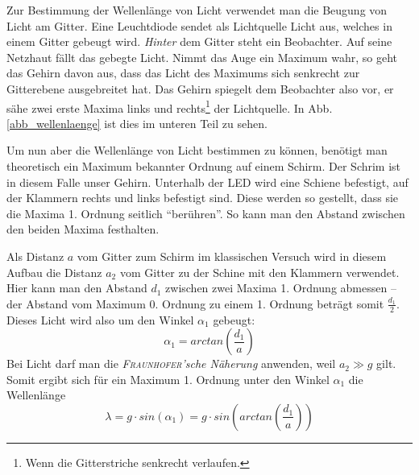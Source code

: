 Zur Bestimmung der Wellenlänge von Licht verwendet man die Beugung von Licht am Gitter. Eine Leuchtdiode sendet als Lichtquelle Licht aus, welches in einem Gitter gebeugt wird. \emph{Hinter} dem Gitter steht ein Beobachter. Auf seine Netzhaut fällt das gebegte Licht. Nimmt das Auge ein Maximum wahr, so geht das Gehirn davon aus, dass das Licht des Maximums sich senkrecht zur Gitterebene ausgebreitet hat. Das Gehirn spiegelt dem Beobachter also vor, er sähe zwei erste Maxima links und rechts\footnote{Wenn die Gitterstriche senkrecht verlaufen.} der Lichtquelle. In Abb. \ref{abb_wellenlaenge} ist dies im unteren Teil zu sehen.

Um nun aber die Wellenlänge von Licht bestimmen zu können, benötigt man theoretisch ein Maximum bekannter Ordnung auf einem Schirm. Der Schrim ist in diesem Falle unser Gehirn. Unterhalb der LED wird eine Schiene befestigt, auf der Klammern rechts und links befestigt sind. Diese werden so gestellt, dass sie die Maxima 1. Ordnung seitlich "`berühren"'. So kann man den Abstand zwischen den beiden Maxima festhalten.

Als Distanz $a$ vom Gitter zum Schirm im klassischen Versuch wird in diesem Aufbau die Distanz $a_2$ vom Gitter zu der Schine mit den Klammern verwendet. Hier kann man den Abstand $d_1$ zwischen zwei Maxima 1. Ordnung abmessen -- der Abstand vom Maximum 0. Ordnung zu einem 1. Ordnung beträgt somit $\frac{d_1}{2}$. Dieses Licht wird also um den Winkel $\alpha_1$ gebeugt:
\begin{equation}
   \alpha_1 = arctan \left ( \frac{d_1}{a} \right )
\end{equation}
Bei Licht darf man die \emph{\textsc{Fraunhofer}'sche Näherung} anwenden, weil $a_2 \gg g$ gilt. Somit ergibt sich für ein Maximum 1. Ordnung unter den Winkel $\alpha_1$ die Wellenlänge
\begin{equation}
   \lambda = g \cdot sin ( \alpha_1 ) =  g \cdot sin \left ( arctan \left ( \frac{d_1}{a} \right ) \right ) 
   \label{eq_wellenlaenge_berechnen}
\end{equation}



